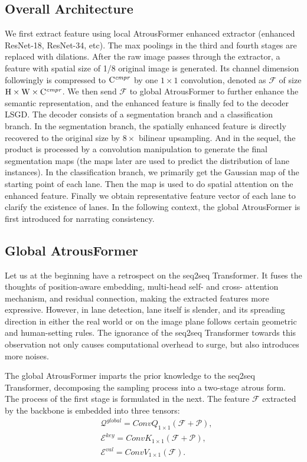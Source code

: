 \documentclass[preprint,12pt,review]{elsarticle}
\begin{document}
\subsection{Overall Architecture}
We first extract feature using local AtrousFormer enhanced extractor (enhanced ResNet-18, ResNet-34, etc). The max poolings in the third and fourth stages are replaced with dilations. After the raw image passes through the extractor, a feature with spatial size of 1/8 original image is generated. Its channel dimension followingly is compressed to $\rm C^{\it{cmpr}}$ by one $1\times 1$ convolution, denoted as $\mathcal{F}$ of size $\rm H\times W \times C^{\it{cmpr}}$. We then send $\mathcal{F}$ to global AtrousFormer to further enhance the semantic representation, and the enhanced feature is finally fed to the decoder LSGD. The decoder consists of a segmentation branch and a classification branch. In the segmentation branch, the spatially enhanced feature is directly recovered to the original size by $8\times$ bilinear upsampling. And in the sequel, the product is processed by a convolution manipulation to generate the final segmentation maps (the maps later are used to predict the distribution of lane instances). In the classification branch, we primarily get the Gaussian map of the starting point of each lane. Then the map is used to do spatial attention on the enhanced feature. Finally we obtain representative feature vector of each lane to clarify the existence of lanes. In the following context, the global AtrousFormer is first introduced for narrating consistency.

\subsection{Global AtrousFormer}
Let us at the beginning have a retrospect on the seq2seq Transformer. It fuses the thoughts of position-aware embedding, multi-head self- and cross- attention mechanism, and residual connection, making the extracted features more expressive. However, in lane detection, lane itself is slender, and its spreading direction in either the real world or on the image plane follows certain geometric and human-setting rules.  The ignorance of the seq2seq Transformer towards this observation not only causes computational overhead to surge, but also introduces more noises.

The global AtrousFormer imparts the prior knowledge to the seq2seq Transformer, decomposing the sampling process into a two-stage atrous form. The process of the first stage is formulated in the next. The feature $\mathcal{F}$ extracted by the backbone is embedded into three tensors:
\begin{equation} \label{embed}
	\begin{aligned}
		& \mathcal{Q}^{global} = ConvQ_{1\times 1}(\mathcal{F}+\mathcal{P}),\\
		& \mathcal{E}^{key} = ConvK_{1\times 1}(\mathcal{F}+\mathcal{P}),\\
		& \mathcal{E}^{val} = ConvV_{1\times 1}(\mathcal{F}).
	\end{aligned} 
\end{equation}
\end{document}
